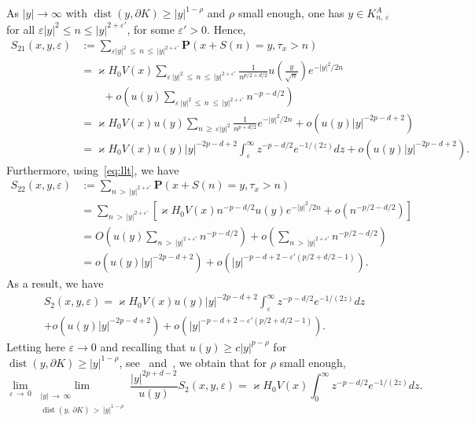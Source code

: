 \documentclass[AHL,Unicode,longabstracts,published]{cedram}
\DeclareMathOperator{\dist}{dist}
\newcommand{\pr}{\mathbf{P}}
\renewcommand{\epsilon}{\varepsilon}
\renewcommand{\ge}{\geqslant}
\renewcommand{\leq}{\leqslant}
\renewcommand{\geq}{\geqslant}
\begin{document}
As $| y|\to\infty$ with $\dist(y,\partial K)\geq | y|^{1-\rho}$ and $\rho$ small enough, one has $y\in K_{n,\,\epsilon}^{A}$ for all $\epsilon| y|^{2}\leq n\leq | y|^{2+\epsilon'}$, for some $\epsilon'>0$. Hence,
\begin{align*}
S_{21}(x,y,\varepsilon) &:=\sum_{\varepsilon| y|^2\,\leq\,n\,\leq\,| y|^{2+\epsilon'}}\pr\left(x+S(n)=y,\tau_x>n\right)\\
&=\varkappa H_0 V(x)\sum_{\varepsilon\,| y|^2\,\leq\,n\,\leq\,| y|^{2+\epsilon'}}\frac{1}{n^{p/2+d/2}} u\left(\frac{y}{\sqrt{n}}\right)e^{-| y|^2/2n}\\
&\quad\quad+o\left(u(y)\sum_{\varepsilon\,| y|^2\,\leq\,n\,\leq\,| y|^{2+\epsilon'}}n^{-p-d/2}\right)\\
&=\varkappa H_0 V(x)u(y)\sum_{n\,\ge\,\varepsilon| y|^2}\frac{1}{n^{p+d/2}}e^{-| y|^2/2n} +o\left(u(y)|y|^{-2p-d+2}\right)\\
&=\varkappa H_0 V(x)u(y)| y|^{-2p-d+2}\int_\varepsilon^\infty z^{-p-d/2}e^{-1/(2z)}dz +o\left(u(y)|y|^{-2p-d+2}\right).
\end{align*}
Furthermore, using~\eqref{eq:llt}, we have
\begin{align*}
S_{22}\left(x,y,\varepsilon\right) &:=\sum_{n\,>\, | y|^{2+\epsilon'}}\pr\left(x+S(n)=y,\tau_x>n\right)\\
&= \sum_{n\,>\,| y|^{2+\epsilon'}}\left[\varkappa H_0 V(x)n^{-p-d/2}u\left(y\right)e^{-| y|^2/2n}+o\left(n^{-p/2-d/2}\right)\right]\\
&= O\left(u(y)\sum_{n\,>\,| y|^{2+\epsilon'}}n^{-p-d/2}\right) +o\left(\sum_{n\,>\,| y|^{2+\epsilon'}}n^{-p/2-d/2}\right)\\
&=o\left(u(y)|y|^{-2p-d+2}\right) +o\left(| y|^{-p-d+2-\epsilon'(p/2+d/2-1)}\right).
\end{align*}
As a result, we have
\begin{multline*}
S_{2}(x,y,\varepsilon) =\varkappa H_0 V(x)u(y)| y|^{-2p-d+2}\int_\varepsilon^\infty z^{-p-d/2}e^{-1/(2z)}dz\\
+o\left(u(y)|y|^{-2p-d+2}\right) +o\left(| y|^{-p-d+2-\epsilon'(p/2+d/2-1)}\right).
\end{multline*}
Letting here $\varepsilon\to0$ and recalling that $u(y)\ge c| y|^{p-\rho}$ for $\dist(y,\partial K)\ge | y|^{1-\rho}$, see~\cite[Lemma~19]{DeWa-15} and~\cite{Va-99}, we obtain that for $\rho$ small enough,
\begin{equation}\label{lim_S_2_b}
\lim_{\varepsilon\,\to\,0}\lim_{\substack{| y|\,\to\,\infty\\ \dist(y,\,\partial K)\,>\,| y|^{1-\rho}}}\frac{| y|^{2p+d-2}}{u(y)}S_2\left(x,y,\varepsilon\right) =\varkappa H_0 V(x)\int_0^\infty z^{-p-d/2}e^{-1/(2z)}dz.
\end{equation}
\end{document}
